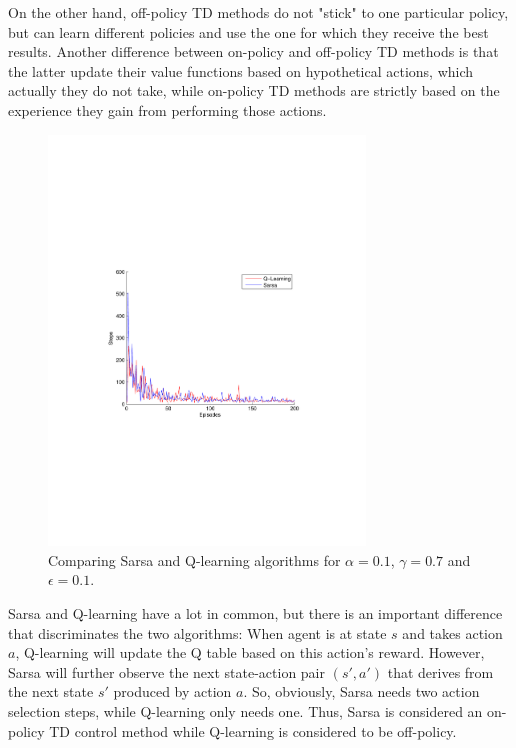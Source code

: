 \documentclass[a4paper,11pt]{article}
\begin{document}
On the other hand, off-policy TD methods do not "stick" to one particular policy, but can learn different policies and use the one for which they receive the best results. Another difference between on-policy and off-policy TD methods is that the latter update their value functions based on hypothetical actions, which actually they do not take, while on-policy TD methods are strictly based on the experience they gain from performing those actions.

\begin{figure}[t!]
  \centering
    \includegraphics[trim=4cm 8.5cm 4cm 8.5cm,clip,width=0.75\textwidth]{figures/sarsaQcomp01.pdf}
    \caption{Comparing Sarsa and Q-learning algorithms for $\alpha = 0.1$, $\gamma = 0.7$ and $\epsilon = 0.1$.}
    \label{sarsaQcomp01}
\end{figure}

Sarsa and Q-learning have a lot in common, but there is an important difference that discriminates the two algorithms: When agent is at state $s$ and takes action $a$, Q-learning will update the Q table based on this action's reward. However, Sarsa will further observe the next state-action pair $(s',a')$ that derives from the next state $s'$ produced by action $a$. So, obviously, Sarsa needs two action selection steps, while Q-learning only needs one. Thus, Sarsa is considered an on-policy TD control method while Q-learning is considered to be off-policy.
\end{document}
